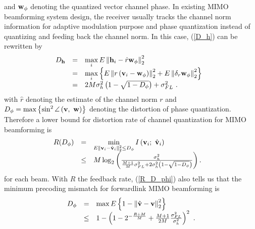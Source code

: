 \documentclass[10pt,fleqn, twocolumn]{IEEEtran}
\newcommand{\bh}{{\bf h}}
\newcommand{\bv}{{\bf v}}
\newcommand{\bw}{{\bf w}}
\begin{document}
and ${\bw}_{\phi}$ denoting the quantized vector channel phase. In
existing MIMO beamforming system design, the receiver usually
tracks the channel norm information for adaptive modulation
purpose and phase quantization instead of quantizing and feeding
back the channel norm. In this case, (\ref{D_h}) can be rewritten
by
\begin{equation}\hspace{-0.10in}
\begin{array}{rcl}
D_{\bh}&=&\max\limits_{i}\mbox{E}\left\|\bh_{i}-\hat{r}{\bw}_{\phi}\right\|_{2}^{2}\\
&=&\max\limits_{i}\left\{\mbox{E}\left\|r\left(\bv_{i}-{\bw}_{\phi}\right)\right\|_{2}^{2}+\mbox{E}\left\|\delta_{r}{\bw}_{\phi}\right\|_{2}^{2}\right\}\\
&=&2M\sigma_{h}^{2}\left(1-\sqrt{1-D_{\phi}}\right)+\sigma_{\mbox{\tiny
FL}}^{2}\ .
\end{array}\label{D_h2}
\end{equation}
\noindent with $\hat{r}$ denoting the estimate of the channel norm
$r$ and $D_{\phi}=\max\left\{\sin^{2}\angle\left(\bv,\
\bw\right)\right\}$ denoting the distortion of phase quantization.
Therefore a lower bound for distortion rate of channel
quantization for MIMO beamforming is
\begin{equation}\hspace{-0.15in}
\begin{array}{rcl}
R(D_{\phi})&=&\min\limits_{E\|\bv_{i}-\hat{\bv}_{i}\|_{2}^{2}\leq
D_{\phi}} I\left(\bv_{i};\
\hat{\bv}_{i}\right)\\
&\hspace{0.0in}\leq&\hspace{0.0in}M\log_{2}\left(\frac{\sigma_{h}^{2}}{\frac{M+1}{M}\sigma_{\mbox{\tiny
FL}}^{2}+2\sigma_{h}^{2}\left(1-\sqrt{1-D_{\phi}}\right)}\right) .
\end{array}\label{R_D_phi}
\end{equation}
\noindent for each beam. With $R$ the feedback rate,
(\ref{R_D_phi}) also tells us that the minimum precoding mismatch
for forwardlink MIMO beamforming is
\begin{equation}%
\begin{array}{rcl}
D_{\phi}&=&\max\mbox{E}\left\{1-\left\|\hat{\bv}-\bv\right\|_{2}^{2}\right\}\\
 &\leq&1-\left(1-2^{-\frac{R+M}{M}}+\frac{M+1}{2M}\frac{\sigma_{\mbox{\tiny
FL}}^{2}}{\sigma_{h}^{2}}\right)^2\ .
\end{array}\label{D_phi}
\end{equation}
\end{document}
